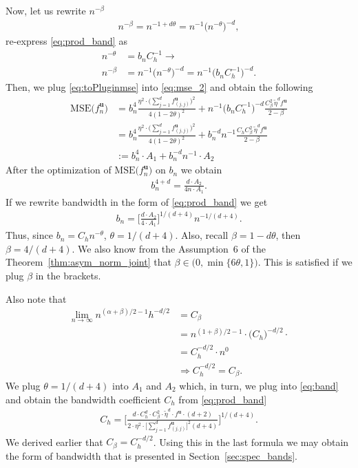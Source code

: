 \documentclass[12pt]{article}
\begin{document}
	Now, let us rewrite $ n^{-\beta} $
	\begin{align}
		n^{-\beta} = n^{-1+d\theta}= n^{-1}\big(n^{-\theta}\big)^{-d},
	\end{align}
	re-express \eqref{eq:prod_band} as 
	\begin{align}
		n^{-\theta} &= b_n C^{-1}_h \rightarrow \\
		n^{-\beta} &= n^{-1}\big(n^{-\theta}\big)^{-d}= n^{-1}\big(b_n C^{-1}_h\big)^{-d}. \label{eq:toPluginmse}
	\end{align}
	Then, we plug \eqref{eq:toPluginmse} into \eqref{eq:mse_2} and obtain the following
	\begin{align}
		\text{MSE}\big(f_n^{\mathbf{u}}\big) &= b^4_n \frac{\eta^2\!\cdot \big(\!\sum_{j=1}^{d}f^{\mathbf{u}}_{(j,j)}\big)^2} {4(1-2\theta)^2} + n^{-1}\big(b_n C^{-1}_h\big)^{-d} \frac{C_\beta^2\, \widetilde{\eta}^df^{\mathbf{u}}}{2-\beta} \\
		&= b^4_n \frac{\eta^2\!\cdot \big(\!\sum_{j=1}^{d}f^{\mathbf{u}}_{(j,j)}\big)^2} {4(1-2\theta)^2} + b_n^{-d} n^{-1} \frac{C_hC_\beta^2\, \widetilde{\eta}^df^{\mathbf{u}}}{2-\beta} \\
		&:= b^4_n\cdot A_1 + b_n^{-d} n^{-1} \cdot A_2
	\end{align}
	After the optimization of $ \text{MSE}\big(f_n^{\mathbf{u}}\big) $ on $ b_n $ we obtain
	\begin{align}
		b_n^{4+d} = \frac{d\cdot A_2}{4n\cdot A_1}.
	\end{align}
	If we rewrite bandwidth in the form of \eqref{eq:prod_band} we get
	\begin{align}
		b_n = \Bigg[\frac{d\cdot A_2}{4\cdot A_1}\Bigg]^{1/(d+4)}n^{-1/(d+4)}.\label{eq:band}
	\end{align}
	Thus, since $ b_n = C_h n^{-\theta} $, $ \theta = 1/(d+4) $. Also, recall $ \beta = 1-d\theta $, then $ \beta=4/(d+4) $. We also know from the Assumption~6 of the Theorem~\ref{thm:asym_norm_joint} that $ \beta \in \big(0, \min\{6\theta, 1\}\big) $. This is satisfied if we plug $ \beta $ in the brackets.
	
	Also note that
	\begin{align}
		\lim_{n \rightarrow \infty}n^{(\alpha+\beta)/2-1}h^{-d/2} &= C_\beta \\
		&= n^{(1+\beta)/2-1}\cdot\big(C_h\big)^{-d/2}\cdot \\
		&= C_h^{-d/2}\cdot n^{0} \\
		&\Rightarrow C_h^{-d/2} = C_\beta.
	\end{align}
	We plug $ \theta = 1/(d+4) $ into $ A_1 $ and $ A_2 $ which, in turn, we plug into \eqref{eq:band} and obtain the bandwidth coefficient $ C_h $ from \eqref{eq:prod_band}
	\begin{align}
		C_h = \Bigg[\frac{d\cdot C_h^d\cdot C_\beta^2\cdot \widetilde{\eta}^d \cdot f^{\mathbf{u}}\cdot (d+2)}{2\cdot \eta^2\cdot \big[\sum_{j=1}^{d}f^{\mathbf{u}}_{(j,j)}\big]^2(d+4)}\Bigg]^{1/(d+4)}.
	\end{align}
	We derived earlier that $ C_\beta=C^{-d/2}_h $. Using this in the last formula we may obtain the form of bandwidth that is presented in Section~\ref{sec:spec_bands}.
	
\end{document}
